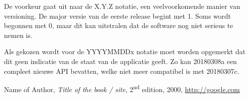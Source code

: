 \documentclass[12pt]{article}
\begin{document}
\noindent De voorkeur gaat uit naar de X.Y.Z notatie, een veelvoorkomende manier van versioning. De major versie van de eerste release begint met 1. Soms wordt begonnen met 0, maar dit kan uitstralen dat de software nog niet serieus te nemen is.

Als gekozen wordt voor de YYYYMMDDx notatie moet worden opgemerkt dat dit geen indicatie van de staat van de applicatie geeft. Zo kan 20180308a een compleet nieuwe API bevatten, welke niet meer compatibel is met 20180307c.


\begin{thebibliography}{9}
		Name of Author,
		\textit{Title of the book / site},
		2\textsuperscript{nd} edition,
		2000,
		\url{http://google.com}
\end{thebibliography}
\end{document}
